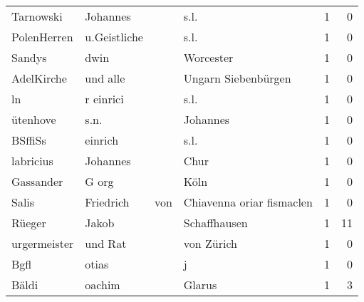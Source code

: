 \begin{tabular}{llllrr}
                Tarnowski &                           Johannes &             &                                        s.l. &          1 &         0 \\
              PolenHerren &                       u.Geistliche &             &                                        s.l. &          1 &         0 \\
                   Sandys &                               dwin &             &                                   Worcester &          1 &         0 \\
               AdelKirche &                           und alle &             &                         Ungarn Siebenbürgen &          1 &         0 \\
                       ln &                          r einrici &             &                                        s.l. &          1 &         0 \\
                 ütenhove &                               s.n. &             &                                    Johannes &          1 &         0 \\
                  BSffiSs &                            einrich &             &                                        s.l. &          1 &         0 \\
                labricius &                           Johannes &             &                                        Chur &          1 &         0 \\
                Gassander &                              G org &             &                                        Köln &          1 &         0 \\
                    Salis &                          Friedrich &         von &                   Chiavenna oriar fismaclen &          1 &         0 \\
                   Rüeger &                              Jakob &             &                                Schaffhausen &          1 &        11 \\
             urgermeister &                            und Rat &             &                                  von Zürich &          1 &         0 \\
                     Bgfl &                              otias &             &                                           j &          1 &         0 \\
                    Bäldi &                             oachim &             &                                      Glarus &          1 &         3 \\

\end{tabular}
